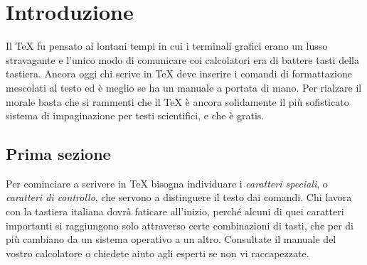 

\section{Introduzione}

Il \TeX{} fu pensato ai lontani tempi in cui i terminali
grafici erano un lusso stravagante e l'unico modo di
comunicare coi calcolatori era di battere tasti della
tastiera. Ancora oggi chi scrive in \TeX{} deve inserire i
comandi di formattazione mescolati al testo ed è meglio
se ha un manuale a portata di mano. Per rialzare
il morale basta che si rammenti che il \TeX{} è ancora
solidamente il più sofisticato sistema di impaginazione
per testi scientifici, e che è gratis.

\subsection{Prima sezione}

Per cominciare a scrivere in \TeX{} bisogna individuare i
\emph{caratteri speciali}, o \emph{caratteri di
controllo}, che servono a
distinguere il testo dai comandi. Chi lavora con la
tastiera italiana dovrà faticare
all'inizio, perché alcuni di quei caratteri importanti
si raggiungono solo attraverso certe combinazioni di
tasti, che per di più cambiano da un sistema
operativo a un altro. Consultate
il manuale del vostro calcolatore o chiedete aiuto agli
esperti se non vi raccapezzate.
